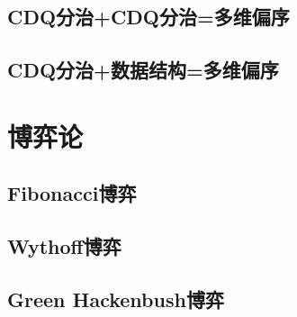\documentclass[twocolumn,a4]{article}  %
\begin{document}
	 	\subsection{CDQ分治+CDQ分治=多维偏序}
	 	 	

		\subsection{CDQ分治+数据结构=多维偏序}
	 	 	
	
	\section{博弈论}
		\subsection{Fibonacci博弈}
	 	 	
	 	 	
		\subsection{Wythoff博弈}
	 	 	
	 	 	
		\subsection{Green Hackenbush博弈}
	 	 	
\end{document}

